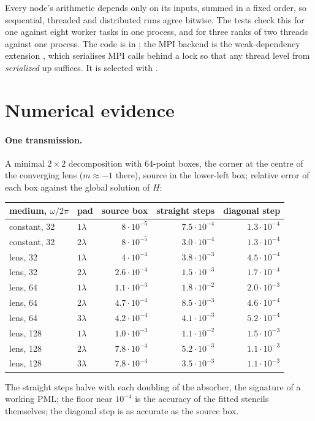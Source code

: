 \documentclass[11pt]{article}
\begin{document}
Every node's arithmetic depends only on its inputs, summed in a fixed order, so
sequential, threaded and distributed runs agree bitwise. The tests check this for one
against eight worker tasks in one process, and for three ranks of two threads against one
process. The code is in ; the MPI backend is the weak-dependency
extension , which serialises MPI calls behind a lock
so that any thread level from \emph{serialized} up suffices. It is selected with
.

\section{Numerical evidence}

\paragraph{One transmission.} A minimal $2\times2$ decomposition with $64$-point boxes, the
corner at the centre of the converging lens ($m\approx-1$ there), source in the lower-left
box; relative error of each box against the global solution of $H$:
\begin{center}\small
\begin{tabular}{llrrr}
\toprule
medium, $\omega/2\pi$ & pad & source box & straight steps & diagonal step \\
\midrule
constant, 32 & $1\lambda$ & $8\cdot10^{-5}$ & $7.5\cdot10^{-4}$ & $1.3\cdot10^{-4}$ \\
constant, 32 & $2\lambda$ & $8\cdot10^{-5}$ & $3.0\cdot10^{-4}$ & $1.3\cdot10^{-4}$ \\
lens, 32     & $1\lambda$ & $4\cdot10^{-4}$ & $3.8\cdot10^{-3}$ & $4.5\cdot10^{-4}$ \\
lens, 32     & $2\lambda$ & $2.6\cdot10^{-4}$ & $1.5\cdot10^{-3}$ & $1.7\cdot10^{-4}$ \\
lens, 64     & $1\lambda$ & $1.1\cdot10^{-3}$ & $1.8\cdot10^{-2}$ & $2.0\cdot10^{-3}$ \\
lens, 64     & $2\lambda$ & $4.7\cdot10^{-4}$ & $8.5\cdot10^{-3}$ & $4.6\cdot10^{-4}$ \\
lens, 64     & $3\lambda$ & $4.2\cdot10^{-4}$ & $4.1\cdot10^{-3}$ & $5.2\cdot10^{-4}$ \\
lens, 128    & $1\lambda$ & $1.0\cdot10^{-3}$ & $1.1\cdot10^{-2}$ & $1.5\cdot10^{-3}$ \\
lens, 128    & $2\lambda$ & $7.8\cdot10^{-4}$ & $5.2\cdot10^{-3}$ & $1.1\cdot10^{-3}$ \\
lens, 128    & $3\lambda$ & $7.8\cdot10^{-4}$ & $3.5\cdot10^{-3}$ & $1.1\cdot10^{-3}$ \\
\bottomrule
\end{tabular}
\end{center}
The straight steps halve with each doubling of the absorber, the signature of a working
PML; the floor near $10^{-4}$ is the accuracy of the fitted stencils themselves; the
diagonal step is as accurate as the source box.
\end{document}

